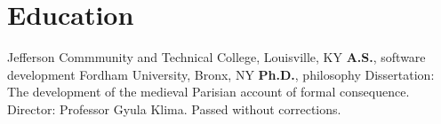 \vspace*{0.4cm}
\section{Education}
{%
	Jefferson Commmunity and Technical College, Louisville, KY}
{%
	\textbf{A.S.}, software development}
{}
	{%
		Fordham University, Bronx, NY}
	{%
		\textbf{Ph.D.}, philosophy}
	{%
	Dissertation: The development of the medieval Parisian account of formal consequence. Director: Professor Gyula Klima. Passed without corrections.}
%
